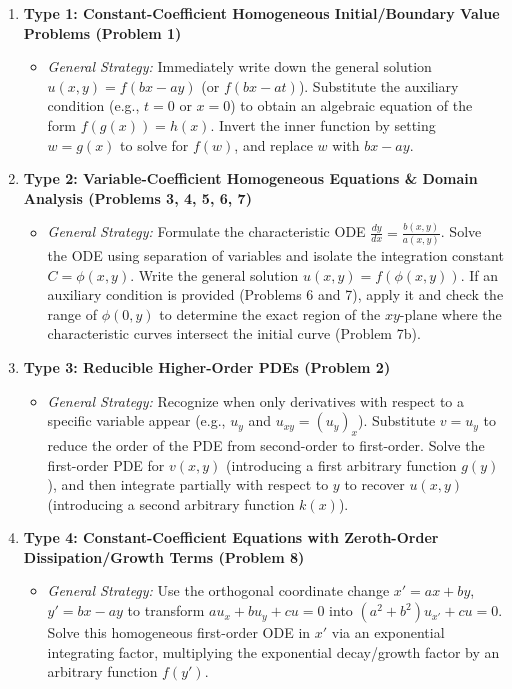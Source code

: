 \documentclass[11pt]{article}
\begin{document}
\begin{enumerate}
    \item \textbf{Type 1: Constant-Coefficient Homogeneous Initial/Boundary Value Problems (Problem 1)}
    \begin{itemize}
        \item \emph{General Strategy:} Immediately write down the general solution $u(x, y) = f(bx - ay)$ (or $f(bx - at)$). Substitute the auxiliary condition (e.g., $t = 0$ or $x = 0$) to obtain an algebraic equation of the form $f(g(x)) = h(x)$. Invert the inner function by setting $w = g(x)$ to solve for $f(w)$, and replace $w$ with $bx - ay$.
    \end{itemize}

    \item \textbf{Type 2: Variable-Coefficient Homogeneous Equations \& Domain Analysis (Problems 3, 4, 5, 6, 7)}
    \begin{itemize}
        \item \emph{General Strategy:} Formulate the characteristic ODE $\frac{dy}{dx} = \frac{b(x,y)}{a(x,y)}$. Solve the ODE using separation of variables and isolate the integration constant $C = \phi(x, y)$. Write the general solution $u(x, y) = f(\phi(x, y))$. If an auxiliary condition is provided (Problems 6 and 7), apply it and check the range of $\phi(0, y)$ to determine the exact region of the $xy$-plane where the characteristic curves intersect the initial curve (Problem 7b).
    \end{itemize}

    \item \textbf{Type 3: Reducible Higher-Order PDEs (Problem 2)}
    \begin{itemize}
        \item \emph{General Strategy:} Recognize when only derivatives with respect to a specific variable appear (e.g., $u_y$ and $u_{xy} = (u_y)_x$). Substitute $v = u_y$ to reduce the order of the PDE from second-order to first-order. Solve the first-order PDE for $v(x, y)$ (introducing a first arbitrary function $g(y)$), and then integrate partially with respect to $y$ to recover $u(x, y)$ (introducing a second arbitrary function $k(x)$).
    \end{itemize}

    \item \textbf{Type 4: Constant-Coefficient Equations with Zeroth-Order Dissipation/Growth Terms (Problem 8)}
    \begin{itemize}
        \item \emph{General Strategy:} Use the orthogonal coordinate change $x' = ax + by$, $y' = bx - ay$ to transform $au_x + bu_y + cu = 0$ into $(a^2 + b^2)u_{x'} + cu = 0$. Solve this homogeneous first-order ODE in $x'$ via an exponential integrating factor, multiplying the exponential decay/growth factor by an arbitrary function $f(y')$.
    \end{itemize}


\end{enumerate}
\end{document}
